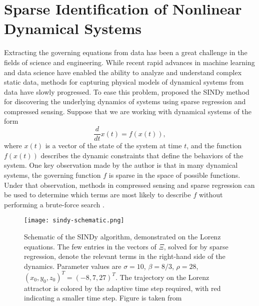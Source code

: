 \section{Sparse Identification of Nonlinear Dynamical Systems}

Extracting the governing equations from data has been a great challenge in the fields of science and engineering.
While recent rapid advances in machine learning and data science have enabled the ability to analyze and understand complex static data, methods for capturing physical models of dynamical systems from data have slowly progressed.
To ease this problem, \citeauthor{bruntonDiscoveringGoverningEquations2016} \cite{bruntonDiscoveringGoverningEquations2016} proposed the \gls{SINDy} method for discovering the underlying dynamics of systems using sparse regression and compressed sensing.
Suppose that we are working with dynamical systems of the form
\begin{equation*}
    \frac{d}{dt} x(t) = f(x(t)),
\end{equation*}
where $x(t)$ is a vector of the state of the system at time $t$, and the function $f(x(t))$ describes the dynamic constraints that define the behaviors of the system.
One key observation made by the author is that in many dynamical systems, the governing function $f$ is sparse in the space of possible functions.
Under that observation, methods in compressed sensing and sparse regression can be used to determine which terms are most likely to describe $f$ without performing a brute-force search \cite{bruntonDiscoveringGoverningEquations2016}.

\begin{figure}[h]
    \centering
    \texttt{[image: sindy-schematic.png]}
    \caption{Schematic of the SINDy algorithm, demonstrated on the Lorenz equations. The few entries in the vectors of $\Xi$, solved for by sparse regression, denote the relevant terms in the right-hand side of the dynamics. Parameter values are $\sigma = 10$, $\beta = 8/3$, $\rho = 28$, $(x_0 , y_0 , z_0)^T = (-8,7,27)^T$. The trajectory on the Lorenz attractor is colored by the adaptive time step required, with red indicating a smaller time step. Figure is taken from \citeauthor{bruntonDiscoveringGoverningEquations2016} \cite{bruntonDiscoveringGoverningEquations2016}}
    \label{fig:sindy-schematic}
\end{figure}

